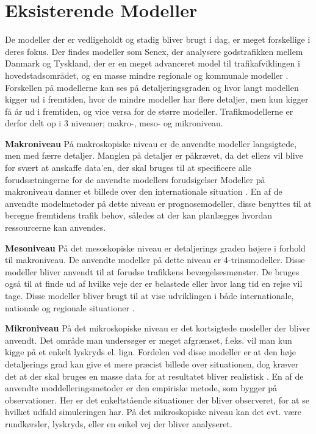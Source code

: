 \section{Eksisterende Modeller}
De modeller der er vedligeholdt og stadig bliver brugt i dag, er meget forskellige i deres fokus. Der findes modeller som Senex, der analysere godstrafikken mellem Danmark og Tyskland, der er en meget advanceret model til trafikafviklingen i hovedstadsområdet, og en masse mindre regionale og kommunale modeller \cite[s. 2]{dtfnotat}. Forskellen på modellerne kan ses på detaljeringsgraden og hvor langt modellen kigger ud i fremtiden, hvor de mindre modeller har flere detaljer, men kun kigger få år ud i fremtiden, og vice versa for de større modeller. Trafikmodellerne er derfor delt op i 3 niveauer; makro-, meso- og mikroniveau.

\vspace{5mm}

\textbf{Makroniveau} På makroskopiske niveau er de anvendte modeller langsigtede, men med færre detaljer. Manglen på detaljer er påkrævet, da det ellers vil blive for svært at anskaffe data’en, der skal bruges til at specificere alle forudsætningerne for de anvendte modellers forudsigelser \cite[s. 1]{dtfnotat} Modeller på makroniveau danner et billede over den internationale situation \cite[s. 9]{dtfnotat}. En af de anvendte modelmetoder på dette niveau er prognosemodeller, disse benyttes til at beregne fremtidens trafik behov, således at der kan planlægges hvordan ressourcerne kan anvendes.\cite{TrafiksimuleringVisSim}


\vspace{5mm}

\textbf{Mesoniveau} På det mesoskopiske niveau er detaljerings graden højere i forhold til makroniveau. De anvendte modeller på dette niveau er 4-trinsmodeller. Disse modeller bliver anvendt til at forudse trafikkens bevægelsesmønster.\cite{TrafiksimuleringVisSim} De bruges også til at finde ud af hvilke veje der er belastede eller hvor lang tid en rejse vil tage. Disse modeller bliver brugt til at vise udviklingen i både internationale, nationale og regionale situationer \cite[s. 9]{dtfnotat}.

\vspace{5mm}

\textbf{Mikroniveau} På det mikroskopiske niveau er det kortsigtede modeller der bliver anvendt. Det område man undersøger er meget afgrænset, f.eks. vil man kun kigge på et enkelt lyskryds el. lign. Fordelen ved disse modeller er at den høje detaljerings grad kan give et mere præcist billede over situationen, dog kræver det at der skal bruges en masse data for at resultatet bliver realistisk \cite[s. 9]{dtfnotat}. En af de anvendte moddelleringsmetoder er den empiriske metode, som bygger på observationer. Her er det enkeltstående situationer der bliver observeret, for at se hvilket udfald simuleringen har. På det mikroskopiske niveau kan det evt. være rundkørsler, lyskryds, eller en enkel vej der bliver analyseret.\cite{TrafiksimuleringVisSim}

